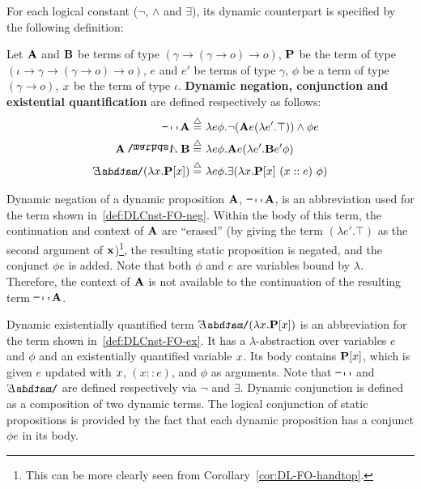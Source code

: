 For each logical constant ($\neg$, $\land$ and $\exists$), its dynamic counterpart is specified by the following definition: 
\begin{definition} \label{def:DLCnst-FO} Let $\A2$ and $\B2$ be terms of type $(\gamma \rightarrow (\gamma \rightarrow o) \rightarrow o)$, $\P2$ be the term of type $(\iota \rightarrow \gamma \rightarrow (\gamma \rightarrow o) \rightarrow o)$, $e$ and  $e'$ be terms of type $\gamma$, $\phi$ be a term of type $(\gamma \rightarrow o)$, $\x1$ be the term of type $\iota$. \textbf{Dynamic negation, conjunction and existential quantification} are defined respectively as follows:
\begin{subequations}
\begin{align}
\n2 \A2 \defeq \ & \lambda e \phi. \neg (\A2 e (\lambda e'. \top) ) \land \phi e  \label{def:DLCnst-FO-neg} \\
\A2 \cnj2 \B2 \defeq \ & \lambda e\phi. \A2 e (\lambda e'. \B2 e' \phi) \label{def:DLCnst-FO-cnj} \\
\ex2 ( \lambda \x1. \P2[\x1]) \defeq \ & \lambda e \phi. \exists ( \lambda \x1. \P2 [\x1] \ (x::e) \ \phi )\label{def:DLCnst-FO-ex} 
\end{align}
\end{subequations}
\end{definition}
Dynamic negation of a dynamic proposition $\A2$, $\n2 \A2$, is an abbreviation used for the term shown in~\eqref{def:DLCnst-FO-neg}. Within the body of this term, the continuation and context of $\A2$ are ``erased'' (by giving the term $(\lambda e'. \top)$ as the second argument of $\x2$)\footnote{This can be more clearly seen from Corollary~\ref{cor:DL-FO-handtop}.}, the resulting static proposition is negated, and the conjunct $\phi e$ is added. Note that both $\phi$ and $e$ are variables bound by $\lambda$. Therefore, the context of $\A2$ is not available to the continuation of the resulting term $\n2 \A2$. 

Dynamic existentially quantified term $\ex2 ( \lambda \x1. \P2[\x1]) $ is an abbreviation for the term shown in~\eqref{def:DLCnst-FO-ex}. It has a $\lambda$-abstraction over variables $e$ and $\phi$ and an existentially quantified variable $\x1$. Its body contains $\P2[\x1]$, which is given $e$ updated with $\x1$, $(x::e)$, and $\phi$ as arguments.  Note that $\n2$ and $\ex2$ are defined respectively via $\neg$ and $\exists$.
Dynamic conjunction is defined as a composition of two dynamic terms. The logical conjunction of static propositions is provided by the fact that each dynamic proposition has a conjunct $\phi e $ in its body.

